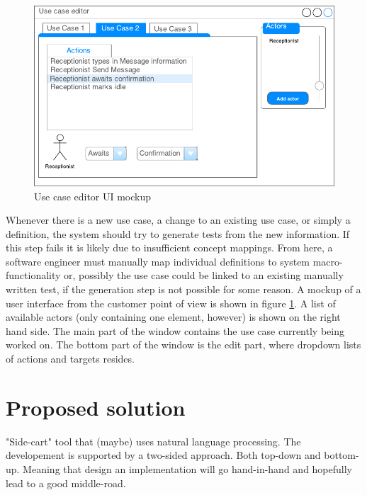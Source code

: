 \begin{figure}[h]
\includegraphics[scale=0.9]{img/test_case_ui}
\centering
\caption{Use case editor UI mockup}
\label{fig:use_case_editor_mockup}
\end{figure}

Whenever there is a new use case, a change to an existing use case, or simply a definition, the system should try to generate tests from the new information. If this step fails it is likely due to insufficient concept mappings. From here, a software engineer must manually map individual definitions to system macro-functionality or, possibly the use case could be linked to an existing manually written test, if the generation step is not possible for some reason. A mockup of a user interface from the customer point of view is shown in figure \ref{fig:use_case_editor_mockup}. A list of available actors (only containing one element, however) is shown on the right hand side. The main part of the window contains the use case currently being worked on. The bottom part of the window is the edit part, where dropdown lists of actions and targets resides.

%

\section{Proposed solution}
"Side-cart" tool that (maybe) uses natural language processing. The developement is supported by a two-sided approach. Both top-down and bottom-up. Meaning that design an implementation will go hand-in-hand and hopefully lead to a good middle-road.


